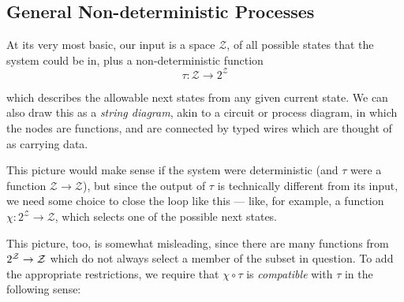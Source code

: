 \documentclass{article}
\theoremstyle{definition}
\newcommand{\Z}{\mathcal Z}
\begin{document}
	
	\subsection{General Non-deterministic Processes}
	
	At its very most basic, our input is a space $\Z$, of all possible states that the system could be in, plus a non-deterministic function	
	\[ \tau: \Z \to 2^{\Z} \] 
	
	which describes the allowable next states from any given current state.
	We can also draw this as a \textit{string diagram}, akin to a circuit or process diagram, in which the nodes are functions, and are connected by typed wires which are thought of as carrying data.
	
	\begin{center}
	\end{center}
	
	This picture would make sense if the system were deterministic (and $\tau$ were a function $\Z \to \Z$), but since the output of $\tau$ is technically different from its input, we need some choice to close the loop like this --- like, for example, a function $\chi: 2^\Z \to \Z$, which selects one of the possible next states.
	
	\begin{center}
	\end{center}

	This picture, too, is somewhat misleading, since there are many functions from $2^{\cal Z} \to \cal Z$ which do not always select a member of the subset in question. To add the appropriate restrictions, we require that $\chi\circ\tau$ is \textit{compatible} with $\tau$ in the following sense:
	
\end{document}
